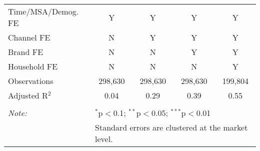 \begin{table}[!htbp]
\begin{tabular}{@{\extracolsep{5pt}}lcccc}
Time/MSA/Demog. FE & Y & Y & Y & Y \\ 
Channel FE & N & Y & Y & Y \\ 
Brand FE & N & N & Y & Y \\ 
Household FE & N & N & N & Y \\ 
Observations & 298,630 & 298,630 & 298,630 & 199,804 \\ 
Adjusted R$^{2}$ & 0.04 & 0.29 & 0.39 & 0.55 \\ 
\hline 
\hline \\[-1.8ex] 
\textit{Note:}  & \multicolumn{4}{l}{$^{*}$p$<$0.1; $^{**}$p$<$0.05; $^{***}$p$<$0.01} \\ 
 & \multicolumn{4}{l}{Standard errors are clustered at the market level.} \\ 
\end{tabular} 
\end{table} 

